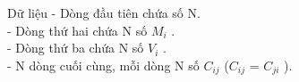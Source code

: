 Dữ liệu  
- Dòng đầu tiên chứa số N.   
\\   - Dòng thứ hai chứa N số $M_{i}$   .   
\\   - Dòng thứ ba chứa N số $V_{i}$   .   
\\   - N dòng cuối cùng, mỗi dòng N số $C_{ij}$   ($C_{ij}$   = $C_{ji}$   ).